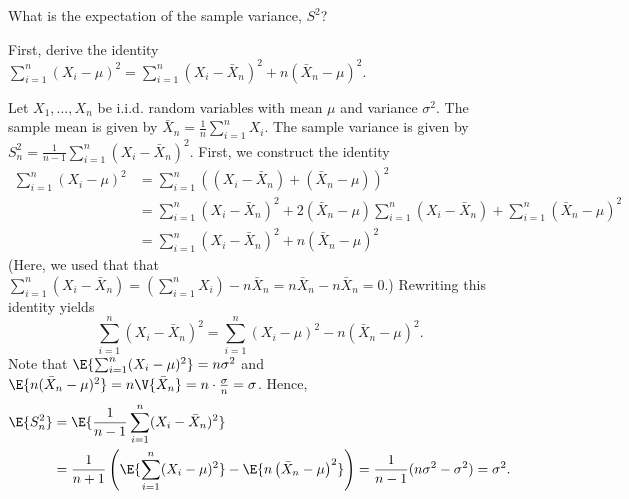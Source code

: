 	\begin{exercise}\label{ex:chap06:04}
		What is the expectation of the sample variance, $S^2$?
		\begin{hint}
			First, derive the identity $\sum_{i = 1}^n (X_i - \mu)^2 = \sum_{i = 1}^n (X_i - \bar{X}_n)^2 + n (\bar{X}_n - \mu)^2$.
		\end{hint}
		\begin{solution}
			Let $X_1, \ldots, X_n$ be i.i.d. random variables with mean $\mu$ and variance $\sigma^2$. The sample mean is given by $\bar{X}_n = \frac{1}{n} \sum_{i = 1}^n X_i$. The sample variance is given by $S_n^2 = \frac{1}{n - 1} \sum_{i = 1}^n (X_i - \bar{X}_n)^2$. First, we construct the identity
			\begin{align*}
				\sum_{i = 1}^n (X_i - \mu)^2 & = \sum_{i = 1}^n ((X_i - \bar{X}_n) + (\bar{X}_n - \mu))^2 \\
				& = \sum_{i = 1}^n (X_i - \bar{X}_n)^2 + 2 (\bar{X}_n - \mu) \sum_{i = 1}^n (X_i - \bar{X}_n) + \sum_{i = 1}^n (\bar{X}_n - \mu)^2 \\
				& = \sum_{i = 1}^n (X_i - \bar{X}_n)^2 + n (\bar{X}_n - \mu)^2
			\end{align*}
			(Here, we used that that $\sum_{i = 1}^n (X_i - \bar{X}_n) = \left(\sum_{i = 1}^n X_i\right) - n \bar{X}_n = n \bar{X}_n - n \bar{X}_n = 0$.) Rewriting this identity yields
			\begin{equation*}
				\sum_{i = 1}^n (X_i - \bar{X}_n)^2 = \sum_{i = 1}^n (X_i - \mu)^2 - n (\bar{X}_n - \mu)^2.
			\end{equation*}
			Note that $\E{\sum_{i = 1}^n (X_i - \mu)^2} = n \sigma^2$ and $\E{n (\bar{X}_n - \mu)^2} = n \V{\bar{X}_n} = n \cdot \frac{\sigma}{n} = \sigma$. Hence,
			\begin{align*}
				\E{S_n^2} & = \E{\frac{1}{n - 1} \sum_{i = 1}^n (X_i - \bar{X}_n)^2} \\
				& = \frac{1}{n + 1} \left(\E{\sum_{i = 1}^n (X_i - \mu)^2} - \E{n\left(\bar{X}_n - \mu\right)^2}\right) = \frac{1}{n - 1} (n \sigma^2 - \sigma^2) = \sigma^2.
			\end{align*}
		\end{solution}
	\end{exercise}
	
